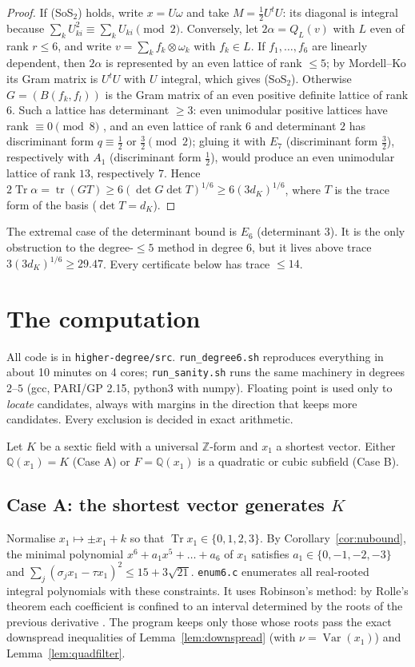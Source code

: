 \documentclass[11pt]{amsart}
\theoremstyle{definition}
\DeclareMathOperator{\Tr}{Tr}
\DeclareMathOperator{\Var}{Var}
\newcommand{\Q}{\mathbb{Q}}
\newcommand{\Z}{\mathbb{Z}}
\newcommand{\file}[1]{\texttt{#1}}
\begin{document}
\begin{proof}
If (SoS$_2$) holds, write $x=U\omega$ and take $M=\frac12U^tU$: its diagonal is integral
because $\sum_kU_{ki}^2\equiv\sum_kU_{ki}\pmod 2$.  Conversely, let $2\alpha=Q_L(v)$ with $L$
even of rank $r\le6$, and write $v=\sum_kf_k\otimes\omega_k$ with $f_k\in L$.  If
$f_1,\dots,f_6$ are linearly dependent, then $2\alpha$ is represented by an even lattice of
rank $\le5$; by Mordell--Ko \cite{Ko,Mo} its Gram matrix is $U^tU$ with $U$ integral, which
gives (SoS$_2$).  Otherwise $G=(B(f_k,f_l))$ is the Gram matrix of an even positive definite
lattice of rank $6$.  Such a lattice has determinant $\ge3$: even unimodular positive
lattices have rank $\equiv0\pmod8$ \cite[Ch.~V]{Se}, and an even lattice of rank $6$ and
determinant $2$ has discriminant form $q\equiv\frac12$ or $\frac32\pmod 2$; gluing it with
$E_7$ (discriminant form $\frac32$), respectively with $A_1$ (discriminant form $\frac12$),
would produce an even unimodular lattice of rank $13$, respectively $7$.  Hence
$2\Tr\alpha=\operatorname{tr}(GT)\ge6(\det G\det T)^{1/6}\ge6(3d_K)^{1/6}$, where $T$ is the
trace form of the basis ($\det T=d_K$).
\end{proof}

The extremal case of the determinant bound is $E_6$ (determinant $3$).  It is the only obstruction to the degree-$\le5$ method in degree $6$, but
it lives above trace $3(3d_K)^{1/6}\ge29.47$.  Every certificate below has trace $\le14$.

\section{The computation}\label{sec:computation}

All code is in \file{higher-degree/src}.  \file{run\_degree6.sh} reproduces everything in
about 10 minutes on 4 cores; \file{run\_sanity.sh} runs the same machinery in degrees $2$--$5$ (gcc, PARI/GP 2.15, python3 with numpy).  Floating point is used
only to \emph{locate} candidates, always with margins in the direction that keeps more
candidates.  Every exclusion is decided in exact arithmetic.

Let $K$ be a sextic field with a universal $\Z$-form and $x_1$ a shortest vector.  Either
$\Q(x_1)=K$ (Case A) or $F=\Q(x_1)$ is a quadratic or cubic subfield (Case B).

\subsection{Case A: the shortest vector generates \texorpdfstring{$K$}{K}}\label{sec:caseA}
Normalise $x_1\mapsto\pm x_1+k$ so that $\Tr x_1\in\{0,1,2,3\}$.  By
Corollary~\ref{cor:nubound}, the minimal polynomial $x^6+a_1x^5+\dots+a_6$ of $x_1$ satisfies
$a_1\in\{0,-1,-2,-3\}$ and $\sum_j(\sigma_jx_1-\tau x_1)^2\le 15+3\sqrt{21}$.
\file{enum6.c} enumerates all real-rooted integral polynomials with these constraints.  It
uses Robinson's method: by Rolle's theorem each coefficient is confined to an interval
determined by the roots of the previous derivative \cite{Ro,MS}.  The program keeps only
those whose roots pass the exact downspread inequalities of Lemma~\ref{lem:downspread} (with
$\nu=\Var(x_1)$) and Lemma~\ref{lem:quadfilter}.
\end{document}
